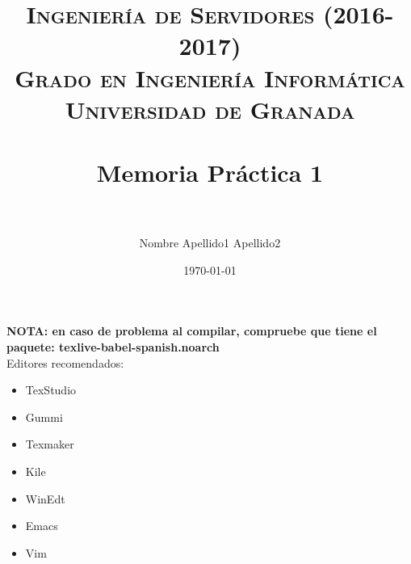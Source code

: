 


\title{	
\normalfont \normalsize 
\textsc{\textbf{Ingeniería de Servidores (2016-2017)} \\ Grado en Ingeniería Informática \\ Universidad de Granada} \\ [25pt] %
\horrule{0.5pt} \\[0.4cm] %
\huge Memoria Práctica 1 \\ %
\horrule{2pt} \\[0.5cm] %
}

\author{Nombre Apellido1 Apellido2} %

\date{\normalsize\today} %




\maketitle %

\newpage %

\tableofcontents %

\listoffigures

\listoftables

\newpage

\textbf{NOTA: en caso de problema al compilar, compruebe que tiene el paquete: texlive-babel-spanish.noarch }  \\
 
 
Editores recomendados:
\begin{itemize}
\item TexStudio 
\item Gummi 
\item Texmaker 
\item Kile 
\item WinEdt 
\item Emacs 
\item Vim 
\end{itemize}

